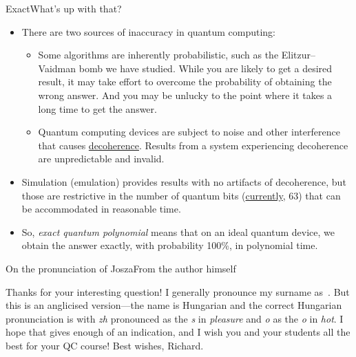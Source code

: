 \begin{frame}{Exact}{What's up with that?}
\begin{itemize}[<+->]
    \item There are two sources of inaccuracy in quantum computing:
    \begin{itemize}
        \item Some algorithms are inherently probabilistic, such as the Elitzur--Vaidman bomb we have studied. While you are likely to get a desired result, it may take effort to overcome the probability of obtaining the wrong answer.  And you may be unlucky to the point where it takes a long time to get the answer.
        \item Quantum computing devices are subject to noise and other interference that causes \href{https://en.wikipedia.org/wiki/Quantum_decoherence}{decoherence}.  Results from a system experiencing decoherence are unpredictable and invalid.
    \end{itemize}
    \item Simulation (emulation) provides results with no artifacts of decoherence, but those are restrictive in the number of quantum bits (\href{https://qiskit.org/documentation/tutorials/simulators/6_extended_stabilizer_tutorial.html}{currently}, 63) that can be accommodated in reasonable time.
    \item So, \emph{exact quantum polynomial} means that on an ideal quantum device, we obtain the answer exactly, with probability 100\%, in polynomial time.
\end{itemize}
\end{frame}

\begin{frame}{On the pronunciation of Josza}{From the author himself}

Thanks for your interesting question!  I generally pronounce my surname as~.
\SmallSkip{}
But this is an anglicised version---the name is Hungarian and the correct Hungarian pronunciation is   with \emph{zh} pronounced as the \emph{s} in \emph{pleasure} and \emph{o} as the \emph{o} in \emph{hot}.
\SmallSkip{}
I hope that gives enough of an indication, and I wish you and your students all the best for your QC course!
\BigSkip{}
Best wishes,  Richard.
\end{frame}

